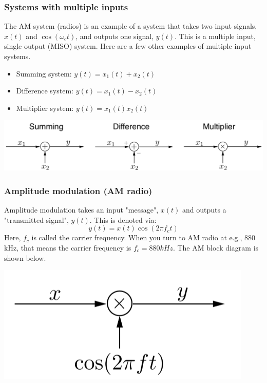 \documentclass[10pt]{article}
\begin{document}
\subsubsection*{Systems with multiple inputs}
The AM system (radios) is an example of a system that takes two input signals, $x(t)$ and $\cos(\omega_c t)$, and outputs one signal, $y(t)$.  This is a multiple input, single output (MISO) system.  Here are a few other examples of multiple input systems.
\begin{itemize}
    \item Summing system: $y(t) = x_1(t) + x_2(t)$
    \item Difference system: $y(t) = x_1(t) - x_2(t)$
    \item Multiplier system: $y(t) = x_1(t)x_2(t)$
\end{itemize}
\begin{center}
    \includegraphics[scale=0.6]{W2_14.png}
\end{center}
\subsubsection*{Amplitude modulation (AM radio)}
Amplitude modulation takes an input "message", $x(t)$ and outputs a "transmitted signal", $y(t)$.  This is denoted via:
\[y(t) = x(t) \cos(2\pi f_c t)\]
Here, $f_c$ is called the carrier frequency.  When you turn to AM radio at e.g., 880 kHz, that means the carrier frequency is $f_c = 880 kHz$.  The AM block diagram is shown below.
\begin{center}
    \includegraphics[scale=0.8]{W2_15.png}
\end{center}
\end{document}
